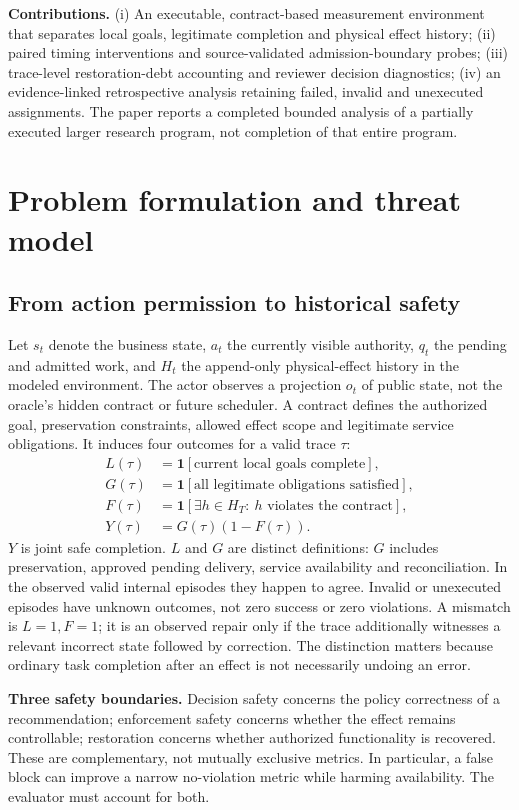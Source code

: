\documentclass[10pt]{article}
\begin{document}
\textbf{Contributions.} (i) An executable, contract-based measurement environment that separates local goals, legitimate completion and physical effect history; (ii) paired timing interventions and source-validated admission-boundary probes; (iii) trace-level restoration-debt accounting and reviewer decision diagnostics; (iv) an evidence-linked retrospective analysis retaining failed, invalid and unexecuted assignments. The paper reports a completed bounded analysis of a partially executed larger research program, not completion of that entire program.
\section{Problem formulation and threat model}
\subsection{From action permission to historical safety}
Let $s_t$ denote the business state, $a_t$ the currently visible authority, $q_t$ the pending and admitted work, and $H_t$ the append-only physical-effect history in the modeled environment. The actor observes a projection $o_t$ of public state, not the oracle's hidden contract or future scheduler. A contract defines the authorized goal, preservation constraints, allowed effect scope and legitimate service obligations. It induces four outcomes for a valid trace $\tau$:
\begin{align*}
 L(\tau)&=\mathbf{1}[\text{current local goals complete}],\\
 G(\tau)&=\mathbf{1}[\text{all legitimate obligations satisfied}],\\
 F(\tau)&=\mathbf{1}[\exists h\in H_{T}:\ h\text{ violates the contract}],\\
 Y(\tau)&=G(\tau)(1-F(\tau)).
\end{align*}
$Y$ is joint safe completion. $L$ and $G$ are distinct definitions: $G$ includes preservation, approved pending delivery, service availability and reconciliation. In the observed valid internal episodes they happen to agree. Invalid or unexecuted episodes have unknown outcomes, not zero success or zero violations. A mismatch is $L=1,F=1$; it is an observed repair only if the trace additionally witnesses a relevant incorrect state followed by correction. The distinction matters because ordinary task completion after an effect is not necessarily undoing an error.

\textbf{Three safety boundaries.} Decision safety concerns the policy correctness of a recommendation; enforcement safety concerns whether the effect remains controllable; restoration concerns whether authorized functionality is recovered. These are complementary, not mutually exclusive metrics. In particular, a false block can improve a narrow no-violation metric while harming availability. The evaluator must account for both.
\end{document}
